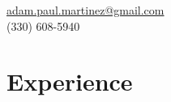 \documentclass[letterpaper,11pt]{article} %
\begin{document}
\pagestyle{empty} %



\begin{center}
\href{mailto:adam.paul.martinez@gmail.com}{adam.paul.martinez@gmail.com} \\
(330) 608-5940
\end{center}


\section{Experience}
\end{document}

